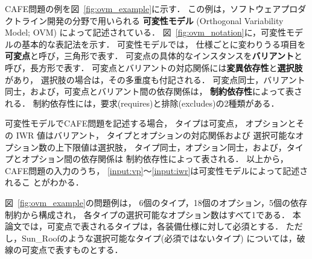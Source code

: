 CAFE問題の例を図~\ref{fig:ovm_example}に示す．
この例は，ソフトウェアプロダクトライン開発の分野で用いられる
\textbf{可変性モデル} (Orthogonal Variability Model; OVM\cite{Pohl05:sple})
によって記述されている．
図~\ref{fig:ovm_notation}に，可変性モデルの基本的な表記法を示す．
可変性モデルでは，
仕様ごとに変わりうる項目を\textbf{可変点}と呼び，三角形で表す．
可変点の具体的なインスタンスを\textbf{バリアント}と呼び，長方形で表す．
可変点とバリアントの対応関係には\textbf{変異依存性}と\textbf{選択肢}があり，
選択肢の場合は，その多重度も付記される．
可変点同士，バリアント同士，および，可変点とバリアント間の依存関係は，
\textbf{制約依存性}によって表される．
制約依存性には，要求(\textsf{requires})と排除(\textsf{excludes})の2種類がある．

可変性モデルでCAFE問題を記述する場合，
タイプは可変点，
オプションとその IWR 値はバリアント，
タイプとオプションの対応関係および
選択可能なオプション数の上下限値は選択肢，
タイプ同士，オプション同士，および，タイプとオプション間の依存関係は
制約依存性によって表される．
以上から，CAFE問題の入力のうち，
\ref{input:vp}〜\ref{input:iwr}は可変性モデルによって記述されるこ
とがわかる．

図~\ref{fig:ovm_example}の問題例は，
6個のタイプ，18個のオプション，5個の依存制約から構成され，
各タイプの選択可能なオプション数はすべて1である．
本論文では，可変点で表されるタイプは，各装備仕様に対して必須とする．
ただし，\textsf{Sun\_Roof}のような選択可能なタイプ(必須ではないタイプ)
については，破線の可変点で表すものとする．

